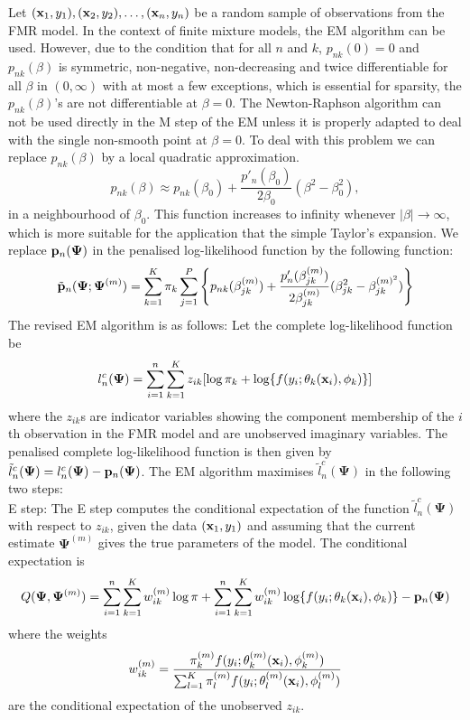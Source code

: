 \documentclass{article}
\newcommand{\bx}{{\bf{x}}}                                                 %
\newcommand{\bPsi}{\boldsymbol \Psi}                              %
\newcommand{\bp}{{\bf p}}                                  %
\begin{document}
Let $(\bx_1, y_1), (\bx_2, y_2), \ldots, (\bx_n, y_n)$ be a random sample of observations from the FMR model. In the context of finite mixture models, the EM algorithm can be used. However, due to the condition that for all $n$ and $k$, $p_{nk}(0)=0$ and $p_{nk}(\beta)$ is symmetric, non-negative, non-decreasing and twice differentiable for all $\beta$ in $(0, \infty)$ with at most a few exceptions, which is essential for sparsity, the $p_{nk}(\beta)$'s are not differentiable at $\beta = 0$. The Newton-Raphson algorithm can not be used directly in the M step of the EM unless it is properly adapted to deal with the single non-smooth point at $\beta = 0$. To deal with this problem we can replace $p_{nk}(\beta)$ by a local quadratic approximation. 
    $$p_{nk}(\beta) \approx p_{nk}(\beta_0) + \frac{p'_n(\beta_0)}{2\beta_0}(\beta^2-\beta_0^2),$$
in a neighbourhood of $\beta_0$. This function increases to infinity whenever $|\beta|\rightarrow \infty$, which is more suitable for the application that the simple Taylor's expansion. We replace $ \bp_n ( \bPsi ) $ in the penalised log-likelihood function by the following function:
    $${\tilde {\bp}_n}( \bPsi; \bPsi^{(m)}) = \sum_{k=1}^K\pi_k\sum_{j=1}^P\left \{ p_{nk}(\beta_{jk}^{(m)}) + \frac{p'_n(\beta_{jk}^{(m)})}     
    {2\beta_{jk}^{(m)}} (\beta^2_{jk} - \beta^{(m)^2}_{jk})\right \}$$
The revised EM algorithm is as follows: Let the complete log-likelihood function be 
    $$l_n^c(\bPsi) = \sum_{i=1}^n\sum_{k=1}^Kz_{ik}[\log \pi_k + \log\{f(y_i;\theta_k(\bx_i),\phi_k)\}]$$
where the $z_{ik}$s are indicator variables showing the component membership of the $i$th observation in the FMR model and are
unobserved imaginary variables. The penalised complete log-likelihood function is then given by ${\tilde l}_n^c(\bPsi) = l_n^c( \bPsi ) - \bp_n(\bPsi)$. The EM algorithm maximises ${\tilde l}_n^c(\bPsi)$ in the following two steps:\\

\noindent E step: The E step computes the conditional expectation of the function ${\tilde l}_n^c(\bPsi)$ with respect to $z_{ik}$, given the data $(\bx_1, y_1)$ and assuming that the current estimate $\bPsi^{(m)}$ gives the true parameters of the model. The conditional expectation is 
    $$Q(\bPsi, \bPsi^{(m)}) = \sum_{i=1}^n\sum_{k=1}^Kw_{ik}^{(m)}\log\pi
                                         + \sum_{i=1}^n\sum_{k=1}^Kw_{ik}^{(m)}\log\{f(y_i;\theta_k(\bx_i), \phi_k)\}
                                         - \bp_n(\bPsi)$$
where the weights
    $$ w_{ik}^{(m)} = \frac{\pi_k^{(m)} f(y_i;\theta_k^{(m)}(\bx_i), \phi_k^{(m)})}
                                {\sum_{l=1}^K\pi_l^{(m)} f(y_i;\theta_l^{(m)}(\bx_i), \phi_l^{(m)})} $$
are the conditional expectation of the unobserved $z_{ik}$.\\
\end{document}

